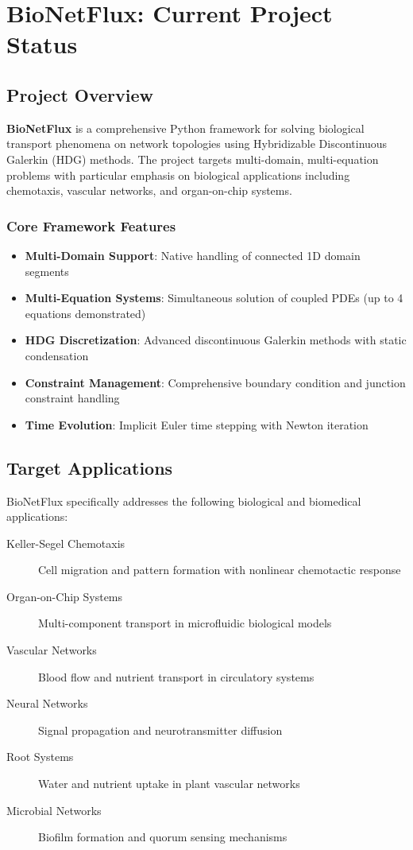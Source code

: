%

\section{BioNetFlux: Current Project Status}

\subsection{Project Overview}

\textbf{BioNetFlux} is a comprehensive Python framework for solving biological transport phenomena on network topologies using Hybridizable Discontinuous Galerkin (HDG) methods. The project targets multi-domain, multi-equation problems with particular emphasis on biological applications including chemotaxis, vascular networks, and organ-on-chip systems.

\subsubsection{Core Framework Features}
\begin{itemize}
    \item \textbf{Multi-Domain Support}: Native handling of connected 1D domain segments
    \item \textbf{Multi-Equation Systems}: Simultaneous solution of coupled PDEs (up to 4 equations demonstrated)
    \item \textbf{HDG Discretization}: Advanced discontinuous Galerkin methods with static condensation
    \item \textbf{Constraint Management}: Comprehensive boundary condition and junction constraint handling
    \item \textbf{Time Evolution}: Implicit Euler time stepping with Newton iteration
\end{itemize}

\subsection{Target Applications}

BioNetFlux specifically addresses the following biological and biomedical applications:

\begin{description}
    \item[Keller-Segel Chemotaxis] Cell migration and pattern formation with nonlinear chemotactic response
    \item[Organ-on-Chip Systems] Multi-component transport in microfluidic biological models
    \item[Vascular Networks] Blood flow and nutrient transport in circulatory systems
    \item[Neural Networks] Signal propagation and neurotransmitter diffusion
    \item[Root Systems] Water and nutrient uptake in plant vascular networks
    \item[Microbial Networks] Biofilm formation and quorum sensing mechanisms
\end{description}

